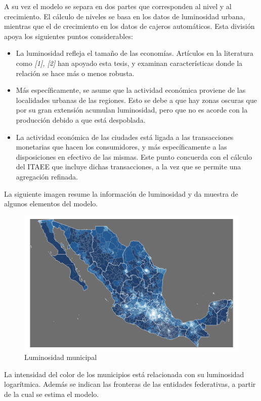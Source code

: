 \documentclass[]{article}
\begin{document}
A su vez el modelo se separa en dos partes que corresponden al nivel y
al crecimiento. El cálculo de niveles se basa en los datos de
luminosidad urbana, mientras que el de crecimiento en los datos de
cajeros automáticos. Esta división apoya los siguientes puntos
considerables:

\begin{itemize}
\item
  La luminosidad refleja el tamaño de las economías. Artículos en la
  literatura como \emph{{[}1{]}, {[}2{]}} han apoyado esta tesis, y
  examinan características donde la relación se hace más o menos
  robusta.
\item
  Más específicamente, se asume que la actividad económica proviene de
  las localidades urbanas de las regiones. Esto se debe a que hay zonas
  oscuras que por su gran extensión acumulan luminosidad, pero que no es
  acorde con la producción debido a que está despoblada.
\item
  La actividad económica de las ciudades está ligada a las transacciones
  monetarias que hacen los consumidores, y más específicamente a las
  disposiciones en efectivo de las mismas. Este punto concuerda con el
  cálculo del ITAEE que incluye dichas transacciones, a la vez que se
  permite una agregación refinada.
\end{itemize}

La siguiente imagen resume la información de luminosidad y da muestra de
algunos elementos del modelo.

\begin{figure}[htbp]
\centering
\includegraphics{ficha_figs/municipios_viirs.png}
\caption{Luminosidad municipal}
\end{figure}

La intensidad del color de los municipios está relacionada con su
luminosidad logarítmica. Además se indican las fronteras de las
entidades federativas, a partir de la cual se estima el modelo.
\end{document}
